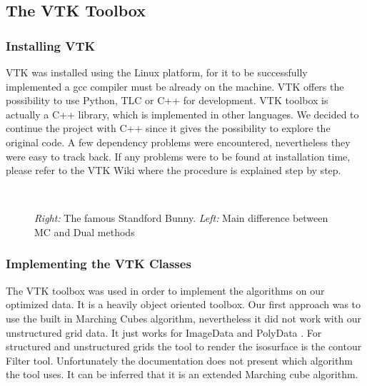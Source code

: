 \subsection{The VTK Toolbox}
\subsubsection{Installing VTK}
VTK was installed using the Linux platform, for it to be successfully implemented a gcc compiler
must be already on the machine. VTK offers the possibility to use Python, TLC or C++ for
development. VTK toolbox is actually a C++ library, which is implemented in other languages. We
decided to continue the project with C++ since it gives the possibility to explore the original code.
A few dependency problems were encountered, nevertheless they were easy to track back. If any
problems were to be found at installation time, please refer to the VTK Wiki where the procedure
is explained step by step.

\begin{figure}
\centering
   \\
   \caption{\textit{Right:} The famous Standford Bunny. \textit{Left:} Main difference between MC and Dual methods }
\end{figure}

\subsubsection{Implementing the VTK Classes}
The VTK toolbox was used in order to implement the algorithms on our optimized data. It is a heavily object
oriented toolbox. Our first approach was to use the built in Marching Cubes algorithm,
nevertheless it did not work with our unstructured grid data. It just works for ImageData and
PolyData . For structured and unstructured grids the tool to render the isosurface is the contour
Filter tool. Unfortunately the documentation does not present which algorithm the tool uses. It
can be inferred that it is an extended Marching cube algorithm.

